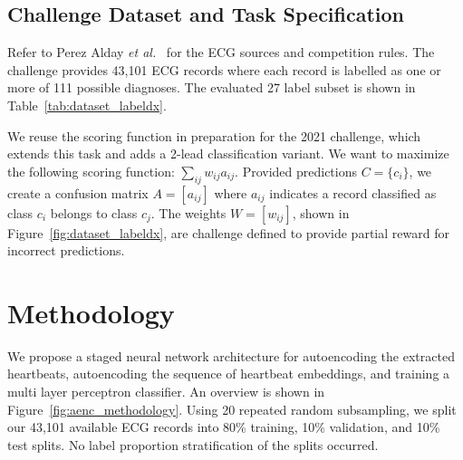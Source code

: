 \documentclass[\main/thesis.tex]{subfiles}
\begin{document}
\subsection{Challenge Dataset and Task Specification}
Refer to Perez Alday \emph{et al.}~\cite{physionet_challenge_2020} for the ECG sources and competition rules.
The challenge provides 43,101 ECG records where each record is labelled as one or more of 111 possible diagnoses.
The evaluated 27 label subset is shown in Table~\ref{tab:dataset_labeldx}.

We reuse the scoring function in preparation for the 2021 challenge, which extends this task and adds a 2-lead classification variant.
We want to maximize the following scoring function: $\sum_{ij} w_{ij} a_{ij}$.
Provided predictions $C = \{c_i\}$, we create a confusion matrix $A = [a_{ij}]$ where $a_{ij}$ indicates a record classified as class $c_i$ belongs to class $c_j$.
The weights $W = [w_{ij}]$, shown in Figure~\ref{fig:dataset_labeldx}, are challenge defined to provide partial reward for incorrect predictions.

\section{Methodology}

We propose a staged neural network architecture for autoencoding the extracted heartbeats, autoencoding the sequence of heartbeat embeddings, and training a multi layer perceptron classifier.
An overview is shown in Figure~\ref{fig:aenc_methodology}.
Using 20 repeated random subsampling, we split our 43,101 available ECG records into 80\% training, 10\% validation, and 10\% test splits.
No label proportion stratification of the splits occurred.
\end{document}
